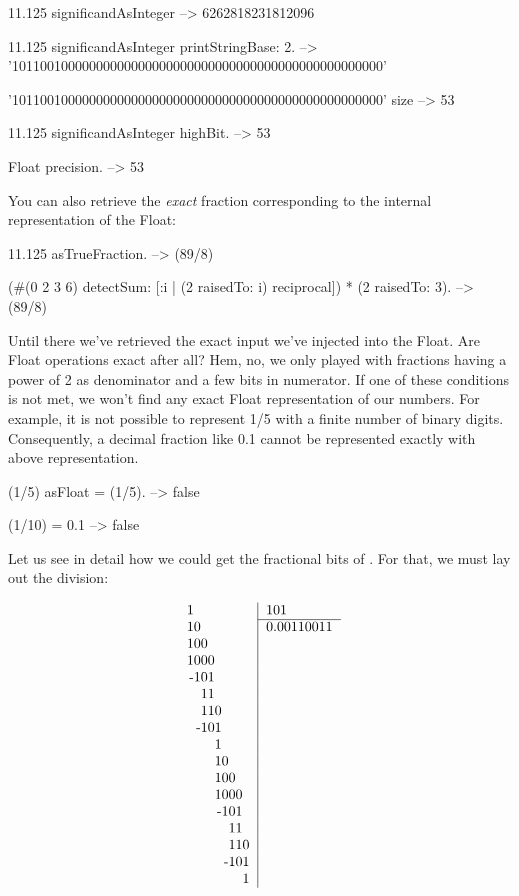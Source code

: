 \documentclass[a4paper,10pt,twoside]{book}
\begin{document}
\begin{code}{}
11.125 significandAsInteger 
	--> 6262818231812096 
 
11.125 significandAsInteger printStringBase: 2.
	--> '10110010000000000000000000000000000000000000000000000'
	
'10110010000000000000000000000000000000000000000000000' size
	--> 53
	
11.125 significandAsInteger highBit.
	--> 53
	
Float precision.
	--> 53
\end{code}

You can also retrieve the \emph{exact} fraction corresponding to the internal representation of the Float:
 \begin{code}{}
 11.125 asTrueFraction.
	-->  (89/8)

(#(0 2 3 6) detectSum: [:i | (2 raisedTo: i) reciprocal]) * (2 raisedTo: 3).
	-->  (89/8)
\end{code}

Until there we've retrieved the exact input we've injected into the Float. Are Float operations exact after all? Hem, no, we only played with fractions having a power of 2 as denominator and a few bits in numerator. If one of these conditions is not met, we won't find any exact Float representation of our numbers. For example, it is not possible to represent 1/5 with a finite number of binary digits. Consequently, a decimal fraction like 0.1 cannot be represented exactly with above representation.
 \begin{code}{}
(1/5) asFloat = (1/5).
	--> false
	
(1/10) = 0.1
	--> false
\end{code}

Let us see in detail how we could get the fractional bits of  \ie \mbox{}. For that, we must lay out the division:

\[
\begin{tabular}{r|l}
\multicolumn{1}{r|}{1\phantom{00000000}} & 101 \\  \cline{2-2}
10\phantom{0000000} & 0.00110011 \\ 
100\phantom{000000}  & \\
1000\phantom{00000}  & \\
-101\phantom{00000}  & \\
   11\phantom{00000}  & \\
   110\phantom{0000} & \\
  -101\phantom{0000} & \\
        1\phantom{0000} & \\
        10\phantom{000} & \\
        100\phantom{00} & \\
        1000\phantom{0} & \\
         -101\phantom{0} & \\
             11\phantom{0} & \\
             110 & \\
            -101 & \\
                  1 & \\
\end{tabular} 
 \]
\end{document}
